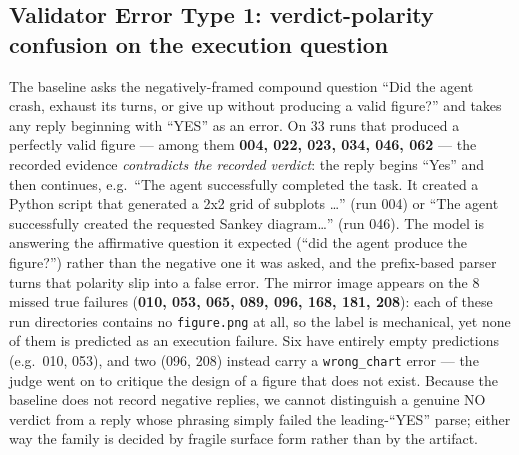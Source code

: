 \documentclass[11pt]{article}
\begin{document}
\subsection{Validator Error Type 1: verdict-polarity confusion on the
execution question}
The baseline asks the negatively-framed compound question ``Did the agent
crash, exhaust its turns, or give up without producing a valid figure?'' and
takes any reply beginning with ``YES'' as an error. On 33 runs that produced
a perfectly valid figure --- among them \textbf{004, 022, 023, 034, 046, 062}
--- the recorded evidence \emph{contradicts the recorded verdict}: the reply
begins ``Yes'' and then continues, e.g.\ ``The agent successfully completed
the task. It created a Python script that generated a 2x2 grid of subplots
\ldots'' (run 004) or ``The agent successfully created the requested Sankey
diagram\ldots'' (run 046). The model is answering the affirmative question it
expected (``did the agent produce the figure?'') rather than the negative one
it was asked, and the prefix-based parser turns that polarity slip into a
false error. The mirror image appears on the 8 missed true failures
(\textbf{010, 053, 065, 089, 096, 168, 181, 208}): each of these run
directories contains no \texttt{figure.png} at all, so the label is
mechanical, yet none of them is predicted as an execution failure. Six have
entirely empty predictions (e.g.\ 010, 053), and two (096, 208) instead
carry a \texttt{wrong\_chart} error --- the judge went on to critique the
design of a figure that does not exist. Because the baseline does not
record negative replies, we cannot distinguish a genuine NO verdict from a
reply whose phrasing simply failed the leading-``YES'' parse; either way
the family is decided by fragile surface form rather than by the artifact.
\end{document}
